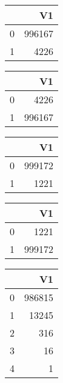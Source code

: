 \bigskip\bigskip
\centering
\begin{tabular}{rr}
  \hline
 & V1 \\ 
  \hline
0 & 996167 \\ 
  1 & 4226 \\ 
   \hline
\end{tabular}

\bigskip\bigskip
\centering
\begin{tabular}{rr}
  \hline
 & V1 \\ 
  \hline
0 & 4226 \\ 
  1 & 996167 \\ 
   \hline
\end{tabular}

\bigskip\bigskip
\centering
\begin{tabular}{rr}
  \hline
 & V1 \\ 
  \hline
0 & 999172 \\ 
  1 & 1221 \\ 
   \hline
\end{tabular}

\bigskip\bigskip
\centering
\begin{tabular}{rr}
  \hline
 & V1 \\ 
  \hline
0 & 1221 \\ 
  1 & 999172 \\ 
   \hline
\end{tabular}

\bigskip\bigskip
\centering
\begin{tabular}{rr}
  \hline
 & V1 \\ 
  \hline
0 & 986815 \\ 
  1 & 13245 \\ 
  2 & 316 \\ 
  3 &  16 \\ 
  4 &   1 \\ 
   \hline
\end{tabular}

